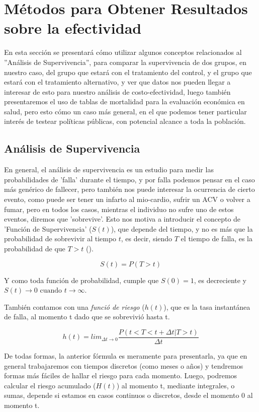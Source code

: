 \documentclass[12pt]{article}
\begin{document}
\section{Métodos para Obtener Resultados sobre la efectividad}

En esta sección se presentará cómo utilizar algunos conceptos relacionados al ''Análisis de Supervivencia'', para comparar la supervivencia de dos grupos, en nuestro caso, del grupo que estará con el tratamiento del control, y el grupo que estará con el tratamiento alternativo, y ver que datos nos pueden llegar a interesar de esto para nuestro análisis de costo-efectividad, luego también presentaremos el uso de tablas de mortalidad para la evaluación económica en salud, pero esto cómo un caso más general, en el que podemos tener particular interés de testear políticas públicas, con potencial alcance a toda la población.

\subsection{Análisis de Supervivencia}

En general, el análisis de supervivencia es un estudio para medir las probabilidades de 'falla' durante el tiempo, y por falla podemos pensar en el caso más genérico de fallecer, pero también nos puede interesar la ocurrencia de cierto evento, como puede ser tener un infarto al mio-cardio, sufrir un ACV o volver a fumar, pero en todos los casos, mientras el individuo no sufre uno de estos eventos, diremos que 'sobrevive'. Esto nos motiva a introducir el concepto de 'Función de Supervivencia' ($S(t)$), que depende del tiempo, y no es más que la probabilidad de sobrevivir al tiempo $t$, es decir, siendo $T$ el tiempo de falla, es la probabilidad de que $T>t$ (\cite{gray_applied_2011}).

$$S(t)=P(T>t)$$

Y como toda función de probabilidad, cumple que $S(0)=1$, es decreciente y $S(t)\longrightarrow 0 \text{  cuando  } t \longrightarrow \infty$.\

También contamos con una \textit{funció de riesgo} ($h(t)$), que es la tasa instantánea de falla, al momento t dado que se sobrevivió hasta t.

$$h(t) = lim_{\Delta{t}\longrightarrow 0}\frac{P(t<T<t+\Delta{t}|T>t)}{\Delta{t}}$$

De todas formas, la anterior fórmula es meramente para presentarla, ya que en general trabajaremos con tiempos discretos (como meses o años) y tendremos formas más fáciles de hallar el riesgo para  cada momento. Luego, podremos calcular el riesgo acumulado ($H(t)$) al momento t, mediante integrales, o sumas, depende si estamos en casos continuos o discretos, desde el momento 0 al momento t.
\end{document}
